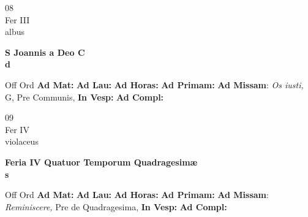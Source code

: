 \documentclass[10pt, openany]{book}
\begin{document}
        \begin{center}
            \begin{minipage}{3.5in}
                \vspace{2em}
                \begin{minipage}{0.5in}
                    {\Huge 08} \\
                    {\normalsize Fer III} \\
                    {\normalsize albus}
                \end{minipage}
                \begin{minipage}{3.0in}
                    \textbf{ \large S Joannis a Deo C \\
                    \textnormal{\normalsize d}} \\ 
                \end{minipage}
                \begin{justify}Off Ord
                    \textbf{Ad Mat: }
                    \textbf{Ad Lau: }
                    \textbf{Ad Horas: }
                    \textbf{Ad Primam: }\textbf{Ad Missam}: \textit{Os iusti,} G, Pre Communis,  
                    \textbf{In Vesp: }
                    \textbf{Ad Compl: }
                \end{justify}
            \end{minipage}
        \end{center}
    
        \begin{center}
            \begin{minipage}{3.5in}
                \vspace{2em}
                \begin{minipage}{0.5in}
                    {\Huge 09} \\
                    {\normalsize Fer IV} \\
                    {\normalsize violaceus}
                \end{minipage}
                \begin{minipage}{3.0in}
                    \textbf{ \large Feria IV Quatuor Temporum Quadragesimæ \\
                    \textnormal{\normalsize s}} \\ 
                \end{minipage}
                \begin{justify}Off Ord
                    \textbf{Ad Mat: }
                    \textbf{Ad Lau: }
                    \textbf{Ad Horas: }
                    \textbf{Ad Primam: }\textbf{Ad Missam}: \textit{Reminiscere,} Pre de Quadragesima,  
                    \textbf{In Vesp: }
                    \textbf{Ad Compl: }
                \end{justify}
            \end{minipage}
        \end{center}
    
\end{document}
